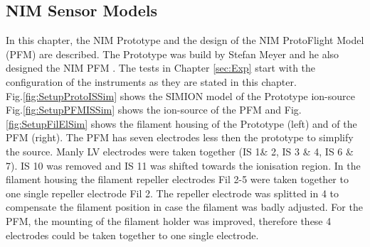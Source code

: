 	\subsection{NIM Sensor Models}\label{subsec:setupInst}
	In this chapter, the NIM Prototype and the design of the NIM ProtoFlight Model (PFM) are described. The Prototype was build by Stefan Meyer and he also designed the NIM PFM \cite{Diss_Meyer}. The tests in Chapter \ref{sec:Exp} start with the configuration of the instruments as they are stated in this chapter.\\
	Fig.\ref{fig:SetupProtoISSim} shows the SIMION model of the Prototype ion-source Fig.\ref{fig:SetupPFMISSim} shows the ion-source of the PFM and Fig.\ref{fig:SetupFilElSim} shows the filament housing of the Prototype (left) and of the PFM (right). The PFM has seven electrodes less then the prototype to simplify the source. Manly LV electrodes were taken together (IS 1\& 2, IS 3 \& 4, IS 6 \& 7). IS 10 was removed and IS 11 was shifted towards the ionisation region. In the filament housing the filament repeller electrodes Fil 2-5 were taken together to one single repeller electrode Fil 2. The repeller electrode was splitted in 4 to compensate the filament position in case the filament was badly adjusted. For the PFM, the mounting of the filament holder was improved, therefore these 4 electrodes could be taken together to one single electrode.\\

	
	
	
	

